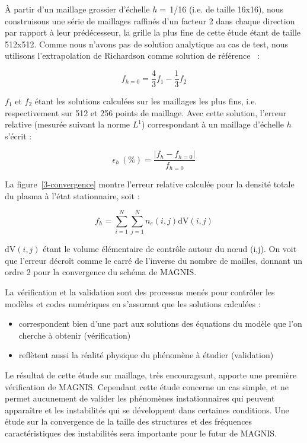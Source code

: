 \begin{refsection}
À partir d'un maillage grossier d'échelle $h=\,$1/16 (i.e. de taille 16x16),
nous construisons une série de maillages raffinés d'un facteur 2 dans chaque direction par rapport à leur prédécesseur, la grille la
plus fine de cette étude étant de taille 512x512. Comme nous n'avons pas de
solution analytique au cas de test, nous utilisons l'extrapolation de
Richardson comme solution de référence~\parencite{Roache} :

\begin{equation}
f_{h=0}=\frac{4}{3}f_{1}-\frac{1}{3}f_2
\end{equation}

$f_{1}$ et $f_2$ étant les solutions calculées sur les maillages les plus fins,
i.e. respectivement sur 512 et 256 points de maillage. Avec cette solution,
l'erreur relative (mesurée suivant la norme $L^1$) correspondant à un maillage
d'échelle $h$ s'écrit :

\begin{equation}
\epsilon_h\,(\text{\%})=\frac{|f_h-f_{h=0}|}{f_{h=0}}
\end{equation}

La figure~\ref{3-convergence} montre l'erreur relative calculée pour la densité
totale du plasma à l'état stationnaire, soit :

\begin{equation}
f_h=\sum_{i=1}^{N}\sum_{j=1}^{N}n_e(i,j)\text{dV}(i,j)
\end{equation}

$\text{dV}(i,j)$ étant le volume élémentaire de contrôle autour du n\oe ud
(i,j). On voit que l'erreur décroît comme le carré de l'inverse du nombre de
mailles, donnant un ordre 2 pour la convergence du schéma de MAGNIS.

La vérification et la validation sont des processus menés
pour contrôler les modèles et codes numériques en s'assurant que les solutions
calculées :

\begin{itemize}
  \item correspondent bien d'une part aux solutions des
  équations du modèle que l'on cherche à obtenir (vérification)
	\item reflètent aussi la réalité
	physique du phénomène à étudier (validation)
	\end{itemize}
	
Le résultat de cette étude sur maillage, très encourageant, apporte une première
vérification de MAGNIS. Cependant cette étude concerne un cas simple,
et ne permet aucunement de valider les phénomènes instationnaires qui peuvent
apparaître et les instabilités qui se développent dans certaines
conditions. Une étude sur la convergence de la taille des structures et des
fréquences caractéristiques des instabilités sera importante pour le futur de
MAGNIS. 


\end{refsection}
